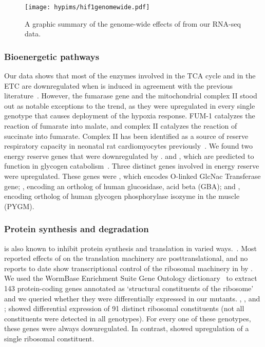 \begin{figure}[tbhp]
\centering
\texttt{[image: hypims/hif1genomewide.pdf]}
\caption{
A graphic summary of the genome-wide effects of \hifp{} from our RNA-seq data.
}
\label{fig:genomewide}
\end{figure}

\subsubsection*{Bioenergetic pathways}
Our data shows that most of the enzymes involved in the TCA cycle and in the ETC
are downregulated when \hifp{} is induced in agreement with the previous
literature~\citep{Semenza2012}.
However, the fumarase gene  and the mitochondrial complex II stood out
as notable exceptions to the trend, as they were upregulated in every single
genotype that causes deployment of the hypoxia response. FUM-1 catalyzes the
reaction of fumarate into malate, and complex II catalyzes the reaction of
succinate into fumarate. Complex II has been identified as a source of reserve
respiratory capacity in neonatal rat cardiomyocytes previously~\citep{Pfleger2015}.
We found two energy reserve genes that were downregulated by \hifp{}.
 and , which are predicted to function in glycogen
catabolism~\citep{Sikora2010}.
Three distinct genes involved in energy reserve were upregulated. These genes were
, which encodes O-linked GlcNac Transferase gene; ,
encoding an ortholog of human glucosidase, acid beta (GBA); and ,
encoding ortholog of human glycogen phosphorylase isozyme in the muscle (PYGM).

\subsubsection*{Protein synthesis and degradation}
\hif{} is also known to inhibit protein synthesis and translation in varied
ways.~\citep{Brugarolas2004}. Most reported effects of
\hifp{} on the translation machinery are posttranslational, and no reports to date
show transcriptional control of the ribosomal machinery in \cel{} by \hifp{}. We
used the WormBase Enrichment Suite Gene Ontology
dictionary~\citep{Angeles-Albores2016b} to extract 143 protein-coding genes
annotated as `structural constituents of the ribosome' and we queried whether
they were differentially expressed in our mutants. \egl{}, \vhl{}, \rhy{} and
\egl{};\vhl{} showed differential expression of 91 distinct ribosomal constituents
(not all constituents were detected in all genotypes). For every one of these
genotypes, these genes were always downregulated. In contrast, \hif{} showed
upregulation of a single ribosomal constituent.

